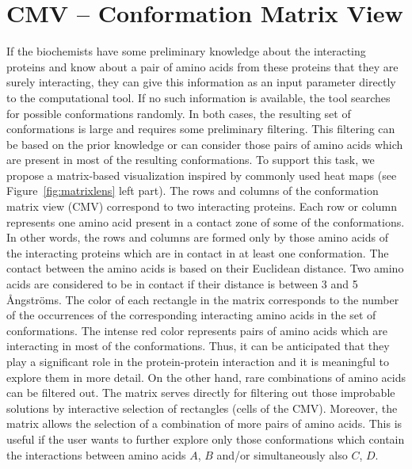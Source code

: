 \documentclass[journal]{vgtc}                %
\begin{document}
\section{CMV -- Conformation Matrix View}
If the biochemists have some preliminary knowledge about the interacting proteins and know about a pair of amino acids from these proteins that they are surely interacting, they can give this information as an input parameter directly to the computational tool.
If no such information is available, the tool searches for possible conformations randomly.
In both cases, the resulting set of conformations is large and requires some preliminary filtering.
This filtering can be based on the prior knowledge or can consider those pairs of amino acids which are present in most of the resulting conformations.
To support this task, we propose a matrix-based visualization inspired by commonly used heat maps (see Figure~\ref{fig:matrixlens} left part).
The rows and columns of the conformation matrix view (CMV) correspond to two interacting proteins.
Each row or column represents one amino acid present in a contact zone of some of the conformations. 
In other words, the rows and columns are formed only by those amino acids of the interacting proteins which are in contact in at least one conformation.
The contact between the amino acids is based on their Euclidean distance. 
Two amino acids are considered to be in contact if their distance is between 3 and 5 \AA ngstr\"{o}ms.
The color of each rectangle in the matrix corresponds to the number of the occurrences of the corresponding interacting amino acids in the set of conformations. 
The intense red color represents pairs of amino acids which are interacting in most of the conformations.
Thus, it can be anticipated that they play a significant role in the protein-protein interaction and it is meaningful to explore them in more detail.
On the other hand, rare combinations of amino acids can be filtered out.
The matrix serves directly for filtering out those improbable solutions by interactive selection of rectangles (cells of the CMV).
Moreover, the matrix allows the selection of a combination of more pairs of amino acids.
This is useful if the user wants to further explore only those conformations which contain the interactions between amino acids $A$, $B$ and/or simultaneously also $C$, $D$. 
\end{document}
